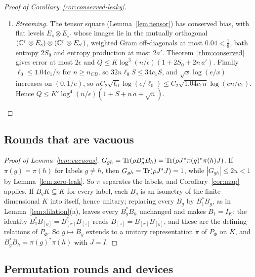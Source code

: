 \begin{proof}[Proof of Corollary~\ref{cor:conserved-leaky}]
\begin{enumerate}[label=\arabic*.,itemsep=1pt]
at most $\frac6{31}+O(n^{-1/2})\le0.2$.
\item \emph{Streaming.} The tensor square (Lemma~\ref{lem:tensor}) has conserved bias, with flat levels $E_s\otimes E_{s'}$ whose images lie in the mutually orthogonal
$(\mathbb C^r\otimes E_s)\otimes(\mathbb C^r\otimes E_{s'})$, weighted Gram off-diagonals at most $0.04<\frac18$, bath entropy $2S_0$ and entropy production at most $2a'$. Theorem~\ref{thm:conserved}
gives error at most $2\epsilon$ and $Q\le K\log^3(n/\epsilon)(1+2S_0+2n\,a')$. Finally $\ell_0\le1.04c_1/n$ for $n\ge n_{CB}$, so $32n\ell_0S\le34c_1S$, and $\sqrt x\log(e/x)$
increases on $(0,1/e)$, so $nC_2\sqrt{\ell_0}\log(e/\ell_0)\le C_2\sqrt{1.04c_1n}\log(en/c_1)$. Hence $Q\le K'\log^4(n/\epsilon)(1+S+n\,a+\sqrt n)$.\qedhere
\end{enumerate}
\end{proof}

\subsection{Rounds that are vacuous}

\begin{proof}[Proof of Lemma~\ref{lem:vacuous}]
$G_{gh}=\operatorname{Tr}(\rho B_g^*B_h)=\operatorname{Tr}(\rho J^*\pi(g)^*\pi(h)J)$. If $\pi(g)=\pi(h)$ for labels $g\ne h$, then $G_{gh}=\operatorname{Tr}(\rho J^*J)=1$, while $|G_{gh}|\le2u<1$ by
Lemma~\ref{lem:zero-leak}. So $\pi$ separates the labels, and Corollary~\ref{cor:map} applies. If $B_gK\subseteq K$ for every label, each $B_g$ is an isometry of the
finite-dimensional $K$ into itself, hence unitary; replacing every $B_g$ by $B_1^*B_g$, as in Lemma~\ref{lem:dilation}(a), leaves every $B_g^*B_h$
unchanged and makes $B_1=I_K$; the identity $B_1^*B_{[y]}=B_{[x]}^*B_{[z]}$ reads $B_{[z]}=B_{[x]}B_{[y]}$, and these are the defining relations
of $P_\Phi$. So $g\mapsto B_g$ extends to a unitary representation $\pi$ of $P_\Phi$ on $K$, and $B_g^*B_h=\pi(g)^*\pi(h)$ with $J=I$.
\end{proof}

\subsection{Permutation rounds and devices}

